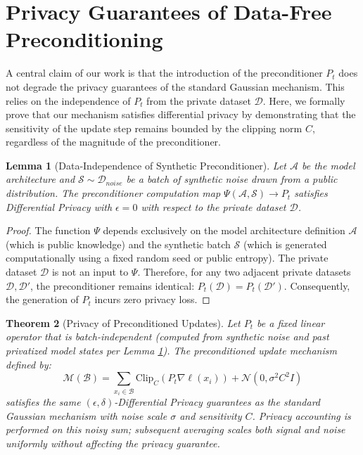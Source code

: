 \documentclass{article}
\theoremstyle{plain}
\newtheorem{theorem}{Theorem}[section]
\newtheorem{lemma}[theorem]{Lemma}
\theoremstyle{definition}
\theoremstyle{remark}
\begin{document}
\clearpage

\section{Privacy Guarantees of Data-Free Preconditioning}
\label{app:privacy_proof}

A central claim of our work is that the introduction of the preconditioner $P_t$ does not degrade the privacy guarantees of the standard Gaussian mechanism. This relies on the independence of $P_t$ from the private dataset $\mathcal{D}$. Here, we formally prove that our mechanism satisfies differential privacy by demonstrating that the sensitivity of the update step remains bounded by the clipping norm $C$, regardless of the magnitude of the preconditioner.

\begin{lemma}[Data-Independence of Synthetic Preconditioner]
\label{lemma:data_independence}
Let $\mathcal{A}$ be the model architecture and $\mathcal{S} \sim \mathcal{D}_{noise}$ be a batch of synthetic noise drawn from a public distribution. The preconditioner computation map $\Psi(\mathcal{A}, \mathcal{S}) \to P_t$ satisfies Differential Privacy with $\epsilon=0$ with respect to the private dataset $\mathcal{D}$.
\end{lemma}

\begin{proof}
The function $\Psi$ depends exclusively on the model architecture definition $\mathcal{A}$ (which is public knowledge) and the synthetic batch $\mathcal{S}$ (which is generated computationally using a fixed random seed or public entropy). The private dataset $\mathcal{D}$ is not an input to $\Psi$. Therefore, for any two adjacent private datasets $\mathcal{D}, \mathcal{D}'$, the preconditioner remains identical: $P_t(\mathcal{D}) = P_t(\mathcal{D}')$. Consequently, the generation of $P_t$ incurs zero privacy loss.
\end{proof}

\begin{theorem}[Privacy of Preconditioned Updates]
\label{thm:privacy_mechanism}
Let $P_t$ be a fixed linear operator that is batch-independent (computed from synthetic noise and past privatized model states per Lemma \ref{lemma:data_independence}). The preconditioned update mechanism defined by:
\begin{equation}
    \mathcal{M}(\mathcal{B}) = \sum_{x_i \in \mathcal{B}} \text{Clip}_C(P_t \nabla \ell(x_i)) + \mathcal{N}(0, \sigma^2 C^2 I)
\end{equation}
satisfies the same $(\epsilon, \delta)$-Differential Privacy guarantees as the standard Gaussian mechanism with noise scale $\sigma$ and sensitivity $C$. Privacy accounting is performed on this noisy sum; subsequent averaging scales both signal and noise uniformly without affecting the privacy guarantee.
\end{theorem}
\end{document}
